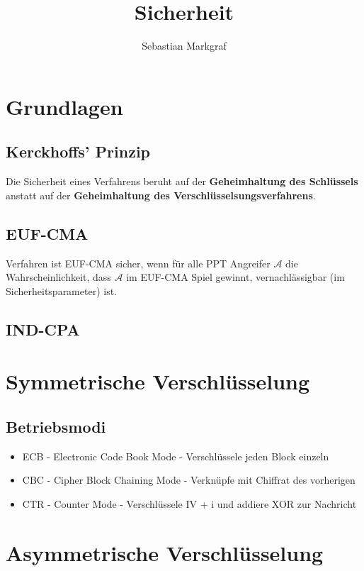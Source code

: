 \documentclass[10pt,a4paper]{article}
\author{Sebastian Markgraf}
\title{Sicherheit}
\begin{document}
	{\let\newpage\relax\maketitle}
	\tableofcontents
	\newpage
	\setcounter{page}{1}

        \section{Grundlagen}
        \subsection{Kerckhoffs' Prinzip}
        Die Sicherheit eines Verfahrens beruht auf der \textbf{Geheimhaltung des Schlüssels}
        anstatt auf der \textbf{Geheimhaltung des Verschlüsselsungsverfahrens}.

        \subsection{EUF-CMA}
        Verfahren ist EUF-CMA sicher, wenn für alle PPT Angreifer \(\mathcal{A}\) die Wahrscheinlichkeit,
         dass \(\mathcal{A}\) im EUF-CMA Spiel gewinnt, vernachlässigbar (im Sicherheitsparameter) ist.

        \subsection{IND-CPA}
        
	\section{Symmetrische Verschlüsselung}
        \subsection{Betriebsmodi}
        \begin{itemize}
        \item ECB - Electronic Code Book Mode - Verschlüssele jeden Block einzeln
        \item CBC - Cipher Block Chaining Mode - Verknüpfe mit Chiffrat des vorherigen
        \item CTR - Counter Mode - Verschlüssele IV + i und addiere XOR zur Nachricht
        \end{itemize}

        \section{Asymmetrische Verschlüsselung}
\end{document}
